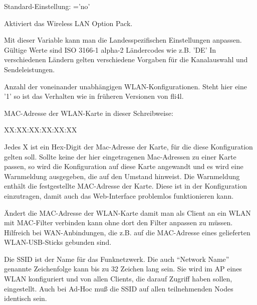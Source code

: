 \begin{description}

        Standard-Einstellung: ='no'

        Aktiviert das Wireless LAN Option Pack.


	Mit dieser Variable kann man die Landesspezifischen Einstellungen anpassen.
	Gültige Werte sind ISO 3166-1 alpha-2 Ländercodes wie z.B. 'DE'
	In verschiedenen Ländern gelten verschiedene Vorgaben für die Kanalauswahl
	und Sendeleistungen.


        Anzahl der voneinander unabhängigen WLAN-Konfigurationen.
        Steht hier eine '1' so ist das Verhalten wie in früheren Versionen
        von fli4l. 
        

         MAC-Adresse der WLAN-Karte in dieser Schreibweise:
         
         XX:XX:XX:XX:XX:XX

         Jedes X ist ein Hex-Digit der Mac-Adresse der Karte, für
         die diese Konfiguration gelten soll. Sollte keine der hier
         eingetragenen Mac-Adressen zu einer Karte passen, so wird
         die Konfiguration  auf diese Karte angewandt und es wird eine
         Warnmeldung ausgegeben, die auf den Umstand hinweist.
         Die Warnmeldung enthält die festgestellte MAC-Adresse der Karte.
         Diese ist in der Konfiguration einzutragen, damit auch das Web-Interface
         problemlos funktionieren kann.


         Ändert die MAC-Adresse der WLAN-Karte damit man als Client an ein WLAN
         mit MAC-Filter verbinden kann ohne dort den Filter anpassen zu müssen.
         Hilfreich bei WAN-Anbindungen, die z.B. auf die MAC-Adresse eines gelieferten
         WLAN-USB-Sticks gebunden sind.


        Die SSID ist der Name für das Funknetzwerk.
        Die auch ``Network Name'' genannte Zeichenfolge kann bis zu 32 Zeichen lang sein.
        Sie wird im AP eines WLAN konfiguriert und von allen Clients,
        die darauf Zugriff haben sollen, eingestellt.
        Auch bei Ad-Hoc muß die SSID auf allen teilnehmenden Nodes identisch sein.



\end{description}
